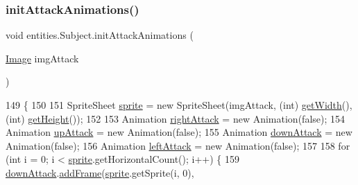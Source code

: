 \subsubsection{\texorpdfstring{init\+Attack\+Animations()}{initAttackAnimations()}\hspace{0.1cm}{\footnotesize\ttfamily [2/2]}}
{\footnotesize\ttfamily void entities.\+Subject.\+init\+Attack\+Animations (\begin{DoxyParamCaption}\item[{\mbox{\hyperlink{classorg_1_1newdawn_1_1slick_1_1_image}{Image}}}]{img\+Attack }\end{DoxyParamCaption})\hspace{0.3cm}{\ttfamily [inline]}}


\begin{DoxyCode}
149                                                       \{
150 
151         SpriteSheet \mbox{\hyperlink{classentities_1_1_physical_entity_aeb439b2308ab19fb6d3ff6be6f7cdbd8}{sprite}} = \textcolor{keyword}{new} SpriteSheet(imgAttack, (\textcolor{keywordtype}{int}) \mbox{\hyperlink{classorg_1_1newdawn_1_1slick_1_1geom_1_1_rectangle_ae2fddc33461303a9ccf8854c1e93c9c1}{getWidth}}(), (\textcolor{keywordtype}{int}) 
      \mbox{\hyperlink{classorg_1_1newdawn_1_1slick_1_1geom_1_1_rectangle_a6c8878e73b4ca0d7a3c2d4e6bcd421ee}{getHeight}}());
152 
153         Animation \mbox{\hyperlink{classentities_1_1_subject_aab2192306daae64078eba6d19699bcf0}{rightAttack}} = \textcolor{keyword}{new} Animation(\textcolor{keyword}{false});
154         Animation \mbox{\hyperlink{classentities_1_1_subject_ab5b8390d2291803a2174b7ae146f86ac}{upAttack}} = \textcolor{keyword}{new} Animation(\textcolor{keyword}{false});
155         Animation \mbox{\hyperlink{classentities_1_1_subject_a5b0e607cea5f2a64d7e7f53035995b7b}{downAttack}} = \textcolor{keyword}{new} Animation(\textcolor{keyword}{false});
156         Animation \mbox{\hyperlink{classentities_1_1_subject_ab40f0af736007eb0a7ba1ee89765225a}{leftAttack}} = \textcolor{keyword}{new} Animation(\textcolor{keyword}{false});
157 
158         \textcolor{keywordflow}{for} (\textcolor{keywordtype}{int} i = 0; i < \mbox{\hyperlink{classentities_1_1_physical_entity_aeb439b2308ab19fb6d3ff6be6f7cdbd8}{sprite}}.getHorizontalCount(); i++) \{
159             \mbox{\hyperlink{classentities_1_1_subject_a5b0e607cea5f2a64d7e7f53035995b7b}{downAttack}}.\mbox{\hyperlink{classorg_1_1newdawn_1_1slick_1_1_animation_ae96843e67072ef3b085072cb0840a8ba}{addFrame}}(\mbox{\hyperlink{classentities_1_1_physical_entity_aeb439b2308ab19fb6d3ff6be6f7cdbd8}{sprite}}.getSprite(i, 0), 

\end{DoxyCode}
